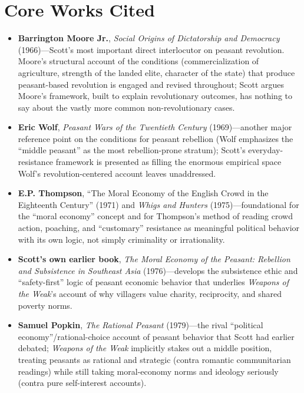 \documentclass[12pt]{article}
\begin{document}
\section{Core Works Cited}

\begin{itemize}[leftmargin=*, itemsep=4pt]
    \item \textbf{Barrington Moore Jr.}, \textit{Social Origins of Dictatorship and Democracy} (1966)---Scott's most important direct interlocutor on peasant revolution. Moore's structural account of the conditions (commercialization of agriculture, strength of the landed elite, character of the state) that produce peasant-based revolution is engaged and revised throughout; Scott argues Moore's framework, built to explain revolutionary outcomes, has nothing to say about the vastly more common non-revolutionary cases.
    \item \textbf{Eric Wolf}, \textit{Peasant Wars of the Twentieth Century} (1969)---another major reference point on the conditions for peasant rebellion (Wolf emphasizes the ``middle peasant'' as the most rebellion-prone stratum); Scott's everyday-resistance framework is presented as filling the enormous empirical space Wolf's revolution-centered account leaves unaddressed.
    \item \textbf{E.P. Thompson}, ``The Moral Economy of the English Crowd in the Eighteenth Century'' (1971) and \textit{Whigs and Hunters} (1975)---foundational for the ``moral economy'' concept and for Thompson's method of reading crowd action, poaching, and ``customary'' resistance as meaningful political behavior with its own logic, not simply criminality or irrationality.
    \item \textbf{Scott's own earlier book}, \textit{The Moral Economy of the Peasant: Rebellion and Subsistence in Southeast Asia} (1976)---develops the subsistence ethic and ``safety-first'' logic of peasant economic behavior that underlies \textit{Weapons of the Weak}'s account of why villagers value charity, reciprocity, and shared poverty norms.
    \item \textbf{Samuel Popkin}, \textit{The Rational Peasant} (1979)---the rival ``political economy''/rational-choice account of peasant behavior that Scott had earlier debated; \textit{Weapons of the Weak} implicitly stakes out a middle position, treating peasants as rational and strategic (contra romantic communitarian readings) while still taking moral-economy norms and ideology seriously (contra pure self-interest accounts).

\end{itemize}
\end{document}
